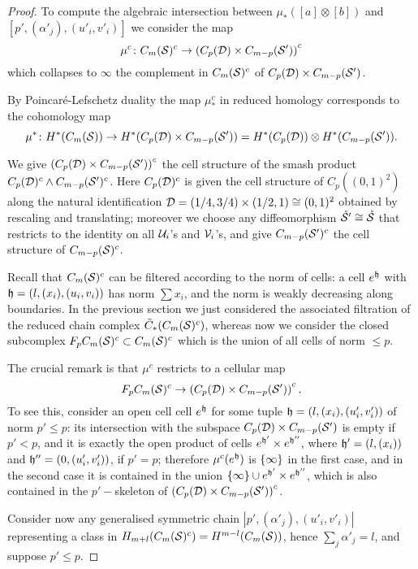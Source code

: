 \begin{proof}
To compute the algebraic intersection
between $\mu_*([a]\otimes [b])$ and $[p',(\alpha'_j),(u'_i,v'_i)]$ we
consider the map
\[
 \mu^c\colon \cms^c\to \pa{C_p(\D)\times C_{m-p}(\S')}^c
\]
which collapses to $\infty$ the complement in $\cms^c$ of $C_p(\D)\times C_{m-p}(\S')$.

By Poincaré-Lefschetz duality the map $\mu^c_*$ in reduced homology corresponds to the cohomology map
\[
 \mu^*\colon H^*(\cms)\to H^*(C_p(\D)\times C_{m-p}(\S'))=H^*(C_p(\D))\otimes H^*(C_{m-p}(\S')).
\]

We give $\pa{C_p(\D)\times C_{m-p}(\S')}^c$ the cell structure of the smash product
$C_p(\D)^c\wedge C_{m-p}(\S')^c$. Here $C_p(\D)^c$ is given the cell structure of $C_p((0,1)^2)$
along the natural identification $\D=(1/4,3/4)\times(1/2,1)\cong(0,1)^2$ obtained by rescaling
and translating; moreover we choose any diffeomorphism $\mrS'\cong\mrS$ that restricts to the identity
on all $\U_i$'s and $\V_i$'s, and give $C_{m-p}(\S')^c$ the cell structure of $C_{m-p}(\S)^c$.

Recall that $\cms^c$ can be filtered according to the norm of cells: a cell $e^{\tup}$ with
$\tup=(l,(x_i),(u_i,v_i))$ has norm $\sum x_i$, and the norm is weakly decreasing along boundaries.
In the previous section we just considered
the associated filtration of the reduced chain complex $\tCh_*(\cms^c)$, whereas now we
consider the closed subcomplex $F_p\cms^c\subset\cms^c$ which is the union
of all cells of norm $\leq p$.

The crucial remark is that $\mu^c$ restricts to a cellular map 
\[
F_p\cms^c\to \pa{C_p(\D)\times C_{m-p}(\S')}^c.
\]
To see this, consider an open cell
cell $e^{\tup}$ for some tuple $\tup=(l, (x_i),(u'_i,v'_i))$ of norm $p'\leq p$:
its intersection with the subspace
$C_p(\D)\times C_{m-p}(\S')$ is empty if $p'<p$, and it is exactly the open product of cells
$e^{\tup'}\times e^{\tup''}$,
where $\tup'=(l,(x_i))$ and $\tup''=(0,(u'_i,v'_i))$, if $p'=p$; therefore
$\mu^c(e^{\tup})$ is $\set{\infty}$ in the first case, and in the second case it
is contained in the union $\set{\infty}\cup e^{\tup'}\times e^{\tup''}$, which is also
contained in the $p'-$skeleton of $\pa{C_p(\D)\times C_{m-p}(\S')}^c$.

% 
Consider now any generalised symmetric chain $|p',(\alpha'_j),(u'_i,v'_i)|$ representing
a class in $H_{m+l}(\cms^c)=H^{m-l}(\cms)$, hence $\sum_j\alpha'_j=l$, and suppose $p'\leq p$.


\end{proof}
